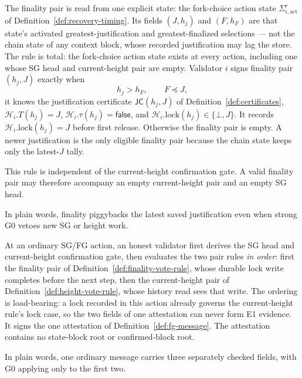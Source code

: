 \begin{definition}
\label{def:finality-vote-rule}
The finality pair is read from one explicit state: the fork-choice
action state \(\Sigma_{i,\mathrm{act}}^r\) of
Definition~\ref{def:recovery-timing}.  Its fields \((J,h_j)\) and
\((F,h_F)\) are that state's activated greatest-justification and
greatest-finalized selections --- not the chain state of any context
block, whose recorded justification may lag the store.  The rule is
total: the fork-choice action state exists at every action, including
one whose SG head and current-height pair are empty.  Validator \(i\)
signs finality pair \((h_j,J)\)
exactly when
\[
 h_j>h_F,\qquad F\preceq J,
\]
it knows the justification certificate \(\mathsf{JC}(h_j,J)\) of
Definition~\ref{def:certificates},
\(\mathcal H_i.T(h_j)=J\),
\(\mathcal H_i.\tau(h_j)=\mathsf{false}\), and
\(\mathcal H_i.\mathrm{lock}(h_j)\in\{\bot,J\}\).
It records \(\mathcal H_i.\mathrm{lock}(h_j)=J\) before first release.  Otherwise
the finality pair is empty.  A newer justification is the only eligible
finality pair because the chain state keeps only the latest-\(J\) tally.

This rule is independent of the current-height confirmation gate.  A valid
finality pair may therefore accompany an empty current-height pair and an
empty SG head.

In plain words, finality piggybacks the latest saved justification even when
strong G0 vetoes new SG or height work.
\end{definition}

\begin{definition}\label{def:fg-rule}
At an ordinary SG/FG action, an honest validator first derives the SG head
and current-height confirmation gate, then evaluates the two pair rules
\emph{in order}: first the finality pair of
Definition~\ref{def:finality-vote-rule}, whose durable lock write
completes before the next step, then the current-height pair of
Definition~\ref{def:height-vote-rule}, whose history read sees that
write.  The ordering is load-bearing: a lock recorded in this action
already governs the current-height rule's lock case, so the two fields
of one attestation can never form E1 evidence.  It
signs the one attestation of Definition~\ref{def:fg-message}.  The attestation
contains no state-block root or confirmed-block root.

In plain words, one ordinary message carries three separately checked
fields, with G0 applying only to the first two.
\end{definition}

